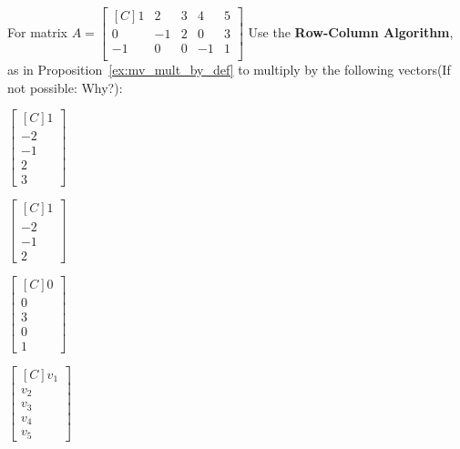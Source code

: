 \begin{exercise}For matrix 
$A=\begin{bmatrix*}[C]
1  & 2  & 3 & 4 & 5 \\
0  & -1 & 2 & 0 & 3 \\
-1 & 0  & 0 & -1& 1 \\
\end{bmatrix*}$
Use the \textbf{Row-Column Algorithm}, as in 
Proposition~\ref{ex:mv_mult_by_def}
to  multiply by the following vectors(If not possible: Why?):\\
\begin{inparaenum}[a.)]
\item $\begin{bmatrix*}[C]1 \\ -2 \\ -1 \\ 2 \\ 3\end{bmatrix*}$\hspace{1cm}
\item $\begin{bmatrix*}[C]1 \\ -2 \\ -1 \\ 2\end{bmatrix*}$\hspace{1cm}
\item $\begin{bmatrix*}[C]0 \\ 0 \\ 3 \\ 0 \\ 1\end{bmatrix*}$\hspace{1cm}
\item $\begin{bmatrix*}[C]v_1 \\ v_2 \\ v_3 \\ v_4 \\ v_5\end{bmatrix*}$
\end{inparaenum}
\end{exercise}

